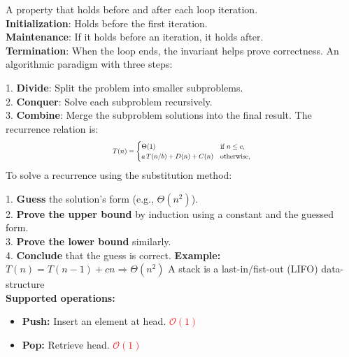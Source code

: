 \documentclass[a4paper,landscape]{article}
\newcommand{\timecomplexity}[1]{\textcolor{red}{#1}}
\newcommand{\bigo}{\mathcal{O}}
\begin{document}
\begin{multicols}{7} %
\tcolorbox[mybox={Facts}]

\endtcolorbox
\tcolorbox[mybox={Loop Invariant}]
A property that holds before and after each loop iteration.\\
\textbf{Initialization}: Holds before the first iteration.\\
\textbf{Maintenance}: If it holds before an iteration, it holds after.\\
\textbf{Termination}: When the loop ends, the invariant helps prove correctness.
\endtcolorbox
\tcolorbox[mybox={Divide and Conquer}]
An algorithmic paradigm with three steps:

1. \textbf{Divide}: Split the problem into smaller subproblems.\\
2. \textbf{Conquer}: Solve each subproblem recursively.\\
3. \textbf{Combine}: Merge the subproblem solutions into the final result.
The recurrence relation is:
\[
\scalebox{0.70}{$
T(n) =
\begin{cases}
\Theta(1) & \text{if } n \leq c, \\
a\,T(n/b) + D(n) + C(n) & \text{otherwise},
\end{cases}
$}
\]
\endtcolorbox
\tcolorbox[mybox={Solving Recurrences}]
To solve a recurrence using the substitution method:

1. \textbf{Guess} the solution's form (e.g., \( \Theta(n^2) \)).\\
2. \textbf{Prove the upper bound} by induction using a constant and the guessed form.\\
3. \textbf{Prove the lower bound} similarly.\\
4. \textbf{Conclude} that the guess is correct.
\textbf{Example:}\\
\( T(n) = T(n - 1) + cn \Rightarrow \Theta(n^2) \)
\endtcolorbox
\tcolorbox[mybox={Stack}]
A stack is a last-in/fist-out (LIFO) data-structure\\
\textbf{Supported operations:}
\begin{itemize}[noitemsep,itemsep=0pt]
    \item \textbf{Push:} Insert an element at head. \timecomplexity{\(\bigo(1)\)}
    \item \textbf{Pop:} Retrieve head. \timecomplexity{\(\bigo(1)\)}
\end{itemize}
\endtcolorbox


\end{multicols}
\end{document}
